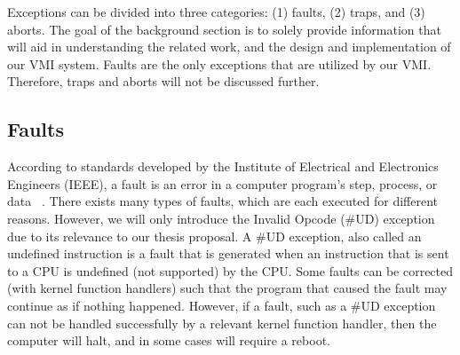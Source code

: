 \documentclass{report}
\begin{document}
\begin{spacing}{1.5}
{\large
\noindent Exceptions can be divided into three categories: (1) faults, (2) traps, and (3) aborts. The goal of the background section is to solely provide information that will aid in understanding the related work, and the design and implementation of our VMI system. Faults are the only exceptions that are utilized by our VMI. Therefore, traps and aborts will not be discussed further.  
}

\subsection{Faults}
{\large
According to standards developed by the Institute of Electrical and Electronics Engineers (IEEE), a fault is an error in a computer program's step, process, or data ~\cite{diallo2017fault}. There exists many types of faults, which are each executed for different reasons. However, we will only introduce the Invalid Opcode (\#UD) exception due to its relevance to our thesis proposal. A \#UD exception, also called an undefined instruction is a fault that is generated when an instruction that is sent to a CPU is undefined (not supported) by the CPU. Some faults can be corrected (with kernel function handlers) such that the program that caused the fault may continue as if nothing happened. However, if a fault, such as a \#UD exception can not be handled successfully by a relevant kernel function handler, then the computer will halt, and in some cases will require a reboot.
\newline
}





\end{spacing}
\end{document}
